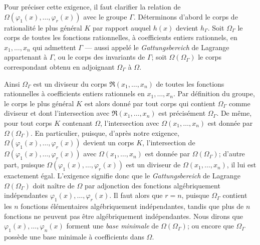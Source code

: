 Pour préciser cette exigence, il faut clarifier la relation de $\Omega(\varphi_1(x),\ldots,\varphi_r(x))$ avec le groupe $\Gamma$. Déterminons d'abord le corps de rationalité le plus général $K$ par rapport auquel $h(x)$ devient $h_\Gamma$. Soit $\Omega_\Gamma$ le corps de toutes les fonctions rationnelles, à coefficients entiers rationnels, en $x_1,
\ldots,x_n$ qui admettent $\Gamma$ --- aussi appelé le \emph{Gattungsbereich} de Lagrange appartenant à $\Gamma$, ou le corps des invariants de $\Gamma$; soit $\Omega(\Omega_\Gamma)$ le corps correspondant obtenu en adjoignant $\Omega_\Gamma$ à $\Omega$.

Ainsi $\Omega_\Gamma$ est un diviseur du corps $\mathfrak R(x_1,
\ldots,x_n)$ de toutes les fonctions rationnelles à coefficients entiers rationnels en $x_1,
\ldots,x_n$. Par définition du groupe, le corps le plus général $K$ est alors donné par tout corps qui contient $\Omega_\Gamma$ comme diviseur et dont l'intersection avec $\mathfrak R(x_1,
\ldots,x_n)$ est précisément $\Omega_\Gamma$. De même, pour tout corps $K$ contenant $\Omega$, l'intersection avec $\Omega(x_1,
\ldots,x_n)$ est donnée par $\Omega(\Omega_\Gamma)$. En particulier, puisque, d'après notre exigence, $\Omega(\varphi_1(x),\ldots,\varphi_r(x))$ devient un corps $K$, l'intersection de $\Omega(\varphi_1(x),\ldots,\varphi_r(x))$ avec $\Omega(x_1,
\ldots,x_n)$ est donnée par $\Omega(\Omega_\Gamma)$; d'autre part, puisque $\Omega(\varphi_1(x),\ldots,\varphi_r(x))$ est un diviseur de $\Omega(x_1,
\ldots,x_n)$, il lui est exactement égal. L'exigence signifie donc que le \emph{Gattungsbereich} de Lagrange $\Omega(\Omega_\Gamma)$ doit naître de $\Omega$ par adjonction des fonctions algébriquement indépendantes $\varphi_1(x),\ldots,\varphi_r(x)$. Il faut alors que $r=n$, puisque $\Omega_\Gamma$ contient les $n$ fonctions élémentaires algébriquement indépendantes, tandis que plus de $n$ fonctions ne peuvent pas être algébriquement indépendantes. Nous dirons que $\varphi_1(x),\ldots,\varphi_n(x)$ forment une \emph{base minimale} de $\Omega(\Omega_\Gamma)$; ou encore que $\Omega_\Gamma$ possède une base minimale à coefficients dans $\Omega$.


